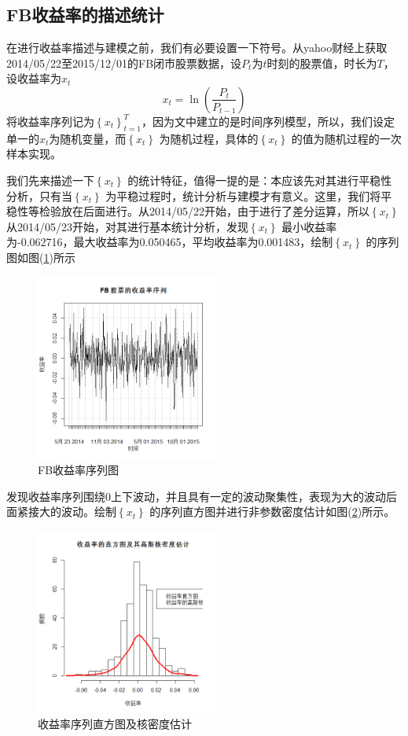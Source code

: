     \subsection{FB收益率的描述统计}
        \par
        在进行收益率描述与建模之前，我们有必要设置一下符号。从yahoo财经上获取2014/05/22至2015/12/01的FB闭市股票数据，设$P_t$为$t$时刻的股票值，时长为$T$，设收益率为$x_t$
        \begin{equation*}
        x_{t}=\ln\left(\frac{P_t}{P_{t-1}}\right)
        \end{equation*}
        将收益率序列记为$\left\{x_t\right\}_{t=1}^T$，因为文中建立的是时间序列模型，所以，我们设定单一的$x_t$为随机变量，而$\left\{x_t\right\}$ 为随机过程，具体的$\left\{x_t\right\}$ 的值为随机过程的一次样本实现。
        \par
        我们先来描述一下$\left\{x_t\right\}$ 的统计特征，值得一提的是：本应该先对其进行平稳性分析，只有当$\left\{x_t\right\}$ 为平稳过程时，统计分析与建模才有意义。这里，我们将平稳性等检验放在后面进行。从2014/05/22开始，由于进行了差分运算，所以$\left\{x_t\right\}$ 从2014/05/23开始，对其进行基本统计分析，发现$\left\{x_t\right\}$ 最小收益率为-0.062716，最大收益率为0.050465，平均收益率为0.001483，绘制$\left\{x_t\right\}$ 的序列图如图(\ref{FB收益率序列图})所示
            \begin{figure}[H]
            \centering
            \includegraphics[width=6cm]{images/FB_rate_of_return.jpg}
            \caption{FB收益率序列图}
            \label{FB收益率序列图}
            \end{figure}
        发现收益率序列围绕0上下波动，并且具有一定的波动聚集性，表现为大的波动后面紧接大的波动。绘制$\left\{x_t\right\}$ 的序列直方图并进行非参数密度估计如图(\ref{收益率序列直方图及核密度估计})所示。
            \begin{figure}[H]
            \centering
            \includegraphics[width=6cm]{images/rate_of_return_sequence_nucear_density_estimation.jpg}
            \caption{收益率序列直方图及核密度估计}
            \label{收益率序列直方图及核密度估计}
            \end{figure}
